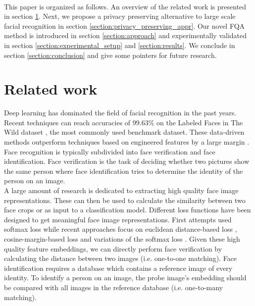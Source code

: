 \documentclass[letterpaper]{article} %
\begin{document}
\\
\newline
This paper is organized as follows. An overview of the related work is presented in section \ref{section:related}. Next, we propose a privacy preserving alternative to large scale facial recognition in section \ref{section:privacy_preserving_appr}. Our novel FQA method is introduced in section \ref{section:approach} and experimentally validated in  section \ref{section:experimental_setup} and \ref{section:results}. We conclude in section \ref{section:conclusion} and give some pointers for future research.

\section{Related work}
\label{section:related}
Deep learning has dominated the field of facial recognition in the past years. Recent techniques can reach accuracies of 99.63\% \cite{schroff2015facenet} on the Labeled Faces in The Wild dataset \cite{huang2008labeled}, the most commonly used benchmark dataset. These data-driven methods outperform techniques based on engineered features by a large margin \cite{masi2018deep}. Face recognition is typically subdivided into face verification and face identification. Face verification is the task of deciding whether two pictures show the same person where face identification tries to determine the identity of the person on an image.
\\
\newline
A large amount of research is dedicated to extracting high quality face image representations. These can then be used to calculate the similarity between two face crops or as input to a classification model. Different loss functions have been designed to get meaningful face image representations. First attempts used softmax loss \cite{sun2014deep} while recent approaches focus on euclidean distance-based loss \cite{schroff2015facenet}, cosine-margin-based loss \cite{wang2017normface} and variations of the softmax loss \cite{deng2019arcface}. Given these high quality feature embeddings, we can directly perform face verification by calculating the distance between two images (i.e. one-to-one matching). Face identification requires a database which contains a reference image of every identity. To identify a person on an image, the probe image's embedding should be compared with all images in the reference database (i.e. one-to-many matching).
\\
\newline
\end{document}
